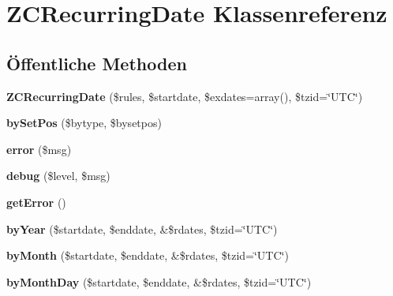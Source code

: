 \hypertarget{class_z_c_recurring_date}{}\section{Z\+C\+Recurring\+Date Klassenreferenz}
\label{class_z_c_recurring_date}
\subsection*{Öffentliche Methoden}
\begin{DoxyCompactItemize}
\item 
\mbox{\label{class_z_c_recurring_date_a9cd0924c16b5736b0602c2422de5f605}} 
{\bfseries Z\+C\+Recurring\+Date} (\$rules, \$startdate, \$exdates=array(), \$tzid=\char`\"{}U\+TC\char`\"{})
\item 
\mbox{\label{class_z_c_recurring_date_a9097d8aa11f944c089dc2748fcbe80d3}} 
{\bfseries by\+Set\+Pos} (\$bytype, \$bysetpos)
\item 
\mbox{\label{class_z_c_recurring_date_a5df23b8b790c61253230fab19c7928a4}} 
{\bfseries error} (\$msg)
\item 
\mbox{\label{class_z_c_recurring_date_a922829866a2a46652f10bc47e42780be}} 
{\bfseries debug} (\$level, \$msg)
\item 
\mbox{\label{class_z_c_recurring_date_a2d2dca704714ab5b56c4603941c08a23}} 
{\bfseries get\+Error} ()
\item 
\mbox{\label{class_z_c_recurring_date_a5003981ca5ab8a6848eeaba789481f3a}} 
{\bfseries by\+Year} (\$startdate, \$enddate, \&\$rdates, \$tzid=\char`\"{}U\+TC\char`\"{})
\item 
\mbox{\label{class_z_c_recurring_date_adac1fe342cbd74f50483e0e6f1c0bdd7}} 
{\bfseries by\+Month} (\$startdate, \$enddate, \&\$rdates, \$tzid=\char`\"{}U\+TC\char`\"{})
\item 
\mbox{\label{class_z_c_recurring_date_aa926fceffcb514d56379f86aabc74536}} 
{\bfseries by\+Month\+Day} (\$startdate, \$enddate, \&\$rdates, \$tzid=\char`\"{}U\+TC\char`\"{})

\end{DoxyCompactItemize}
